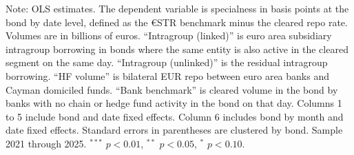 \documentclass[english, 11pt, oneside, legal]{article}
\begin{document}
\begin{table}[htbp]
    \begin{flushleft}
        \footnotesize Note: OLS estimates. The dependent variable is specialness in basis points at the bond by date level, defined as the \euro{}STR benchmark minus the cleared repo rate. Volumes are in billions of euros. ``Intragroup (linked)'' is euro area subsidiary intragroup borrowing in bonds where the same entity is also active in the cleared segment on the same day. ``Intragroup (unlinked)'' is the residual intragroup borrowing. ``HF volume'' is bilateral EUR repo between euro area banks and Cayman domiciled funds. ``Bank benchmark'' is cleared volume in the bond by banks with no chain or hedge fund activity in the bond on that day. Columns 1 to 5 include bond and date fixed effects. Column 6 includes bond by month and date fixed effects. Standard errors in parentheses are clustered by bond. Sample 2021 through 2025. $^{***}$ $p<0.01$, $^{**}$ $p<0.05$, $^{*}$ $p<0.10$.
    \end{flushleft}
\end{table}
\end{document}
